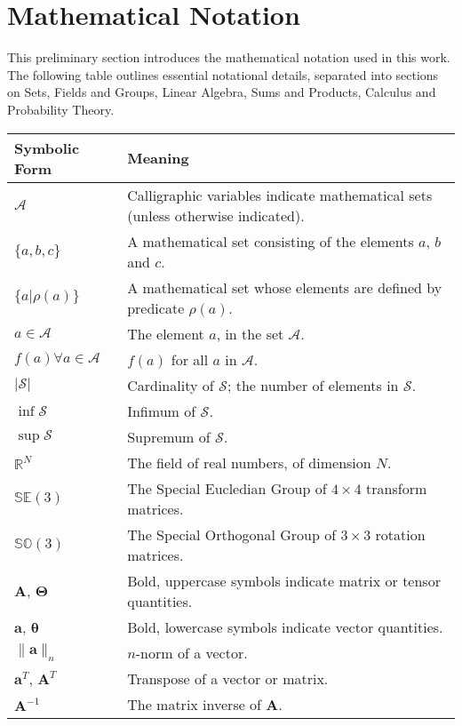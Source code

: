 \section*{Mathematical Notation}
This preliminary section introduces the mathematical notation used in this work. The following 
table outlines essential notational details, separated into sections on Sets, Fields and Groups, 
Linear Algebra, Sums and Products, Calculus and Probability Theory.
\begin{longtable}{p{} | p{}}
  \hline
  Symbolic Form & Meaning \\
  \hline
  \( \mathcal{A} \) & Calligraphic variables indicate mathematical sets (unless otherwise indicated).\\
  \( \{ a, b, c \} \) & A mathematical set consisting of the elements \( a \), \( b \) and \( c \).\\
  \( \{ a | \rho(a) \} \) & A mathematical set whose elements are defined by predicate \( \rho(a) \).\\
  \( a \in \mathcal{A} \) & The element \( a \), in the set \( \mathcal{A} \).\\
  \( f(a) \forall a \in \mathcal{A} \) & \( f(a) \) for all \( a \) in \( \mathcal{A} \).\\
  \( | \mathcal{S} | \) & Cardinality of \( \mathcal{S} \); the number of elements in \( \mathcal{S} \).\\
  \( \inf \mathcal{S} \) & Infimum of \( \mathcal{S} \).\\
  \( \sup \mathcal{S} \) & Supremum of \( \mathcal{S} \).\\
  \hline
  \( \mathbb{R}^{N} \) & The field of real numbers, of dimension \( N \).\\
  \( \mathbb{SE}(3) \) & The Special Eucledian Group of \( 4 \times 4 \) transform matrices.\\
  \( \mathbb{SO}(3) \) & The Special Orthogonal Group of \( 3 \times 3 \) rotation matrices.\\
  \hline
  \( \bm{A}\), \( \bm{\Theta} \) & Bold, uppercase symbols indicate matrix or tensor quantities.\\
  \( \bm{a}\), \( \bm{\theta} \) & Bold, lowercase symbols indicate vector quantities.\\
  \( \lVert \bm{a} \rVert_{n} \) & \( n \)-norm of a vector.\\
  \( \bm{a}^{T} \), \( \bm{A}^{T} \) & Transpose of a vector or matrix.\\
  \( \bm{A}^{-1} \) & The matrix inverse of \( \bm{A} \).\\

\end{longtable}
